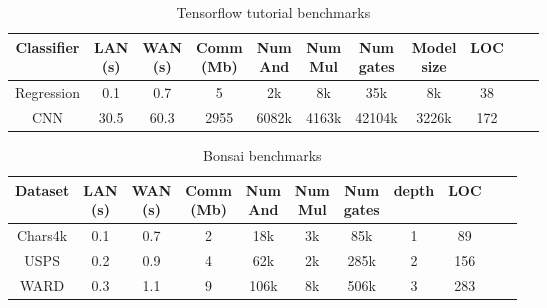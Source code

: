 \setlength\tabcolsep{2.5pt}
\begin{table}
\footnotesize
\begin{tabular}{|c|c|c|c |c|c|c|c|c|c | c}
\hline
Classifier       & \thead{LAN  \\ (s)} & \thead{WAN \\(s)} & \thead{Comm \\(Mb)}  & \thead{Num \\ And} & \thead{Num \\ Mul} & \thead{Num \\ gates} & \thead{Model \\size} & LOC\\
\hline
Regression &  0.1         & 0.7         & 5            & 2k    & 8k    &  35k    & 8k   & 38\\
\hline
CNN        &  30.5        & 60.3        & 2955         & 6082k & 4163k &  42104k & 3226k& 172\\
\hline
\end{tabular}

 \caption{Tensorflow tutorial benchmarks}
 \label{tab:tf} 
\end{table}
\setlength\tabcolsep{3.5pt}
\begin{table}
\footnotesize
\begin{tabular}{|c|c|c|c |c|c|c|c|c|c | c|}
\hline
Dataset       & \thead{LAN \\(s)} & \thead{WAN \\(s)} & \thead{Comm \\ (Mb)}  & \thead{Num \\ And} & \thead{Num \\ Mul} & \thead{Num \\ gates} & depth & LOC\\
\hline
Chars4k    &  0.1         & 0.7         & 2            & 18k    & 3k    &  85k     & 1   & 89\\
\hline
USPS       &  0.2         & 0.9         & 4            & 62k    & 2k    &  285k    & 2   & 156\\
\hline
WARD       &  0.3         & 1.1         & 9            & 106k    & 8k    &  506k    & 3   & 283\\
\hline
\end{tabular}

 \caption{Bonsai benchmarks}
 \label{tab:bonsai} 
\end{table}

